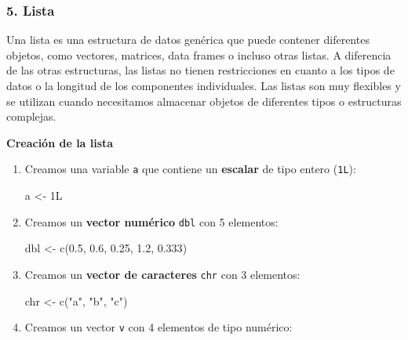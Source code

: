 \documentclass[
  jou,
  floatsintext,
  longtable,
  a4paper,
  nolmodern,
  notxfonts,
  notimes,
  colorlinks=true,linkcolor=blue,citecolor=blue,urlcolor=blue]{apa7}
\newenvironment{Shaded}{\begin{snugshade}}{\end{snugshade}}
\newcommand{\DecValTok}[1]{\textcolor[rgb]{0.68,0.00,0.00}{#1}}
\newcommand{\FloatTok}[1]{\textcolor[rgb]{0.68,0.00,0.00}{#1}}
\newcommand{\FunctionTok}[1]{\textcolor[rgb]{0.28,0.35,0.67}{#1}}
\newcommand{\NormalTok}[1]{\textcolor[rgb]{0.00,0.23,0.31}{#1}}
\newcommand{\OtherTok}[1]{\textcolor[rgb]{0.00,0.23,0.31}{#1}}
\newcommand{\StringTok}[1]{\textcolor[rgb]{0.13,0.47,0.30}{#1}}
\begin{document}
\subsubsection{5. Lista}\label{lista}

Una lista es una estructura de datos genérica que puede contener
diferentes objetos, como vectores, matrices, data frames o incluso otras
listas. A diferencia de las otras estructuras, las listas no tienen
restricciones en cuanto a los tipos de datos o la longitud de los
componentes individuales. Las listas son muy flexibles y se utilizan
cuando necesitamos almacenar objetos de diferentes tipos o estructuras
complejas.

\textbf{Creación de la lista}

\begin{enumerate}
\def\labelenumi{\arabic{enumi}.}
\item
  Creamos una variable \texttt{a} que contiene un \textbf{escalar} de
  tipo entero (\texttt{1L}):

\begin{Shaded}
\begin{Highlighting}[]
\NormalTok{a }\OtherTok{\textless{}{-}} \DecValTok{1}\NormalTok{L}
\end{Highlighting}
\end{Shaded}
\item
  Creamos un \textbf{vector numérico} \texttt{dbl} con 5 elementos:

\begin{Shaded}
\begin{Highlighting}[]
\NormalTok{dbl }\OtherTok{\textless{}{-}} \FunctionTok{c}\NormalTok{(}\FloatTok{0.5}\NormalTok{, }\FloatTok{0.6}\NormalTok{, }\FloatTok{0.25}\NormalTok{, }\FloatTok{1.2}\NormalTok{, }\FloatTok{0.333}\NormalTok{)}
\end{Highlighting}
\end{Shaded}
\item
  Creamos un \textbf{vector de caracteres} \texttt{chr} con 3 elementos:

\begin{Shaded}
\begin{Highlighting}[]
\NormalTok{chr }\OtherTok{\textless{}{-}} \FunctionTok{c}\NormalTok{(}\StringTok{"a"}\NormalTok{, }\StringTok{"b"}\NormalTok{, }\StringTok{"c"}\NormalTok{)}
\end{Highlighting}
\end{Shaded}
\item
  Creamos un vector \texttt{v} con 4 elementos de tipo numérico:


\end{enumerate}
\end{document}
